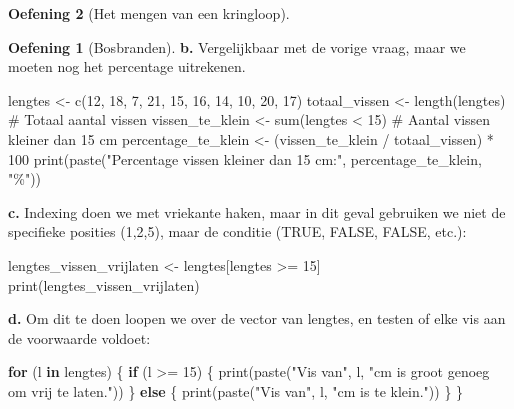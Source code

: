 \documentclass[
  a4paper,
]{scrbook}
\newenvironment{Shaded}{\begin{snugshade}}{\end{snugshade}}
\newcommand{\CommentTok}[1]{\textcolor[rgb]{0.37,0.37,0.37}{#1}}
\newcommand{\ControlFlowTok}[1]{\textcolor[rgb]{0.00,0.23,0.31}{\textbf{#1}}}
\newcommand{\DecValTok}[1]{\textcolor[rgb]{0.68,0.00,0.00}{#1}}
\newcommand{\FunctionTok}[1]{\textcolor[rgb]{0.28,0.35,0.67}{#1}}
\newcommand{\NormalTok}[1]{\textcolor[rgb]{0.00,0.23,0.31}{#1}}
\newcommand{\OtherTok}[1]{\textcolor[rgb]{0.00,0.23,0.31}{#1}}
\newcommand{\SpecialCharTok}[1]{\textcolor[rgb]{0.37,0.37,0.37}{#1}}
\newcommand{\StringTok}[1]{\textcolor[rgb]{0.13,0.47,0.30}{#1}}
\theoremstyle{definition}
\newtheorem{exercise}{Oefening}[chapter]
\theoremstyle{remark}
\begin{document}
\begin{exercise}[Het mengen van een
kringloop]
\begin{exercise}[Bosbranden]
\textbf{b.} Vergelijkbaar met de vorige vraag, maar we moeten nog het
percentage uitrekenen.

\begin{Shaded}
\begin{Highlighting}[]
\NormalTok{lengtes }\OtherTok{\textless{}{-}} \FunctionTok{c}\NormalTok{(}\DecValTok{12}\NormalTok{, }\DecValTok{18}\NormalTok{, }\DecValTok{7}\NormalTok{, }\DecValTok{21}\NormalTok{, }\DecValTok{15}\NormalTok{, }\DecValTok{16}\NormalTok{, }\DecValTok{14}\NormalTok{, }\DecValTok{10}\NormalTok{, }\DecValTok{20}\NormalTok{, }\DecValTok{17}\NormalTok{)}
\NormalTok{totaal\_vissen }\OtherTok{\textless{}{-}} \FunctionTok{length}\NormalTok{(lengtes)  }\CommentTok{\# Totaal aantal vissen}
\NormalTok{vissen\_te\_klein }\OtherTok{\textless{}{-}} \FunctionTok{sum}\NormalTok{(lengtes }\SpecialCharTok{\textless{}} \DecValTok{15}\NormalTok{)  }\CommentTok{\# Aantal vissen kleiner dan 15 cm}
\NormalTok{percentage\_te\_klein }\OtherTok{\textless{}{-}}\NormalTok{ (vissen\_te\_klein }\SpecialCharTok{/}\NormalTok{ totaal\_vissen) }\SpecialCharTok{*} \DecValTok{100}
\FunctionTok{print}\NormalTok{(}\FunctionTok{paste}\NormalTok{(}\StringTok{"Percentage vissen kleiner dan 15 cm:"}\NormalTok{, percentage\_te\_klein, }\StringTok{"\%"}\NormalTok{))}
\end{Highlighting}
\end{Shaded}

\textbf{c.} Indexing doen we met vriekante haken, maar in dit geval
gebruiken we niet de specifieke posities (1,2,5), maar de conditie
(TRUE, FALSE, FALSE, etc.):

\begin{Shaded}
\begin{Highlighting}[]
\NormalTok{lengtes\_vissen\_vrijlaten }\OtherTok{\textless{}{-}}\NormalTok{ lengtes[lengtes }\SpecialCharTok{\textgreater{}=} \DecValTok{15}\NormalTok{]}
\FunctionTok{print}\NormalTok{(lengtes\_vissen\_vrijlaten)}
\end{Highlighting}
\end{Shaded}

\textbf{d.} Om dit te doen loopen we over de vector van lengtes, en
testen of elke vis aan de voorwaarde voldoet:

\begin{Shaded}
\begin{Highlighting}[]
\ControlFlowTok{for}\NormalTok{ (l }\ControlFlowTok{in}\NormalTok{ lengtes) \{}
  \ControlFlowTok{if}\NormalTok{ (l }\SpecialCharTok{\textgreater{}=} \DecValTok{15}\NormalTok{) \{}
    \FunctionTok{print}\NormalTok{(}\FunctionTok{paste}\NormalTok{(}\StringTok{"Vis van"}\NormalTok{, l, }\StringTok{"cm is groot genoeg om vrij te laten."}\NormalTok{))}
\NormalTok{  \} }\ControlFlowTok{else}\NormalTok{ \{}
    \FunctionTok{print}\NormalTok{(}\FunctionTok{paste}\NormalTok{(}\StringTok{"Vis van"}\NormalTok{, l, }\StringTok{"cm is te klein."}\NormalTok{))}
\NormalTok{  \}}
\NormalTok{\}}
\end{Highlighting}
\end{Shaded}


\end{exercise}
\end{exercise}
\end{document}
